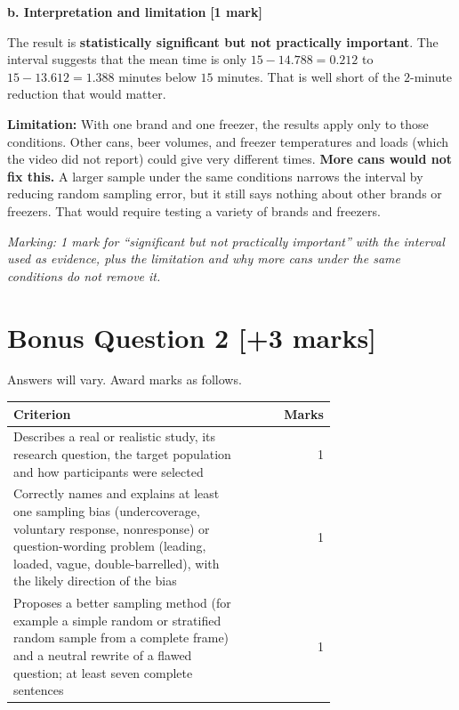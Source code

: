 \documentclass[10pt,letterpaper]{article}
\newcommand{\allocation}[1]{\par\smallskip\textit{Marking: #1}\par}
\begin{document}
\textbf{b. Interpretation and limitation} \hfill\textbf{[1 mark]}

The result is \textbf{statistically significant but not practically important}. The interval suggests that the mean time is only $15-14.788=0.212$ to $15-13.612=1.388$ minutes below $15$ minutes. That is well short of the $2$-minute reduction that would matter.

\textbf{Limitation:} With one brand and one freezer, the results apply only to those conditions. Other cans, beer volumes, and freezer temperatures and loads (which the video did not report) could give very different times. \textbf{More cans would not fix this.} A larger sample under the same conditions narrows the interval by reducing random sampling error, but it still says nothing about other brands or freezers. That would require testing a variety of brands and freezers.

\allocation{1 mark for ``significant but not practically important'' with the interval used as evidence, plus the limitation and why more cans under the same conditions do not remove it.}

\section*{Bonus Question 2 \hfill [+3 marks]}

Answers will vary. Award marks as follows.

\begin{center}
\begin{tabular}{p{0.72\linewidth}r}
\toprule
\textbf{Criterion} & \textbf{Marks} \\
\midrule
Describes a real or realistic study, its research question, the target population and how participants were selected & 1 \\
Correctly names and explains at least one sampling bias (undercoverage, voluntary response, nonresponse) or question-wording problem (leading, loaded, vague, double-barrelled), with the likely direction of the bias & 1 \\
Proposes a better sampling method (for example a simple random or stratified random sample from a complete frame) and a neutral rewrite of a flawed question; at least seven complete sentences & 1 \\
\bottomrule
\end{tabular}
\end{center}
\end{document}
